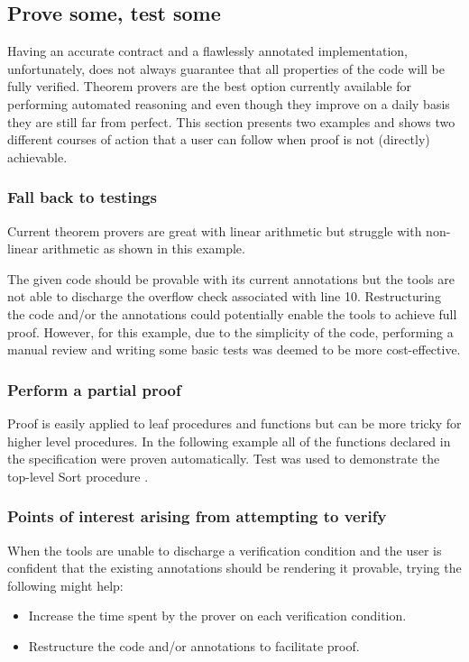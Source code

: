 \documentclass{llncs}
\begin{document}
\subsection{Prove some, test some}
Having an accurate contract and a flawlessly annotated implementation, unfortunately,
does not always guarantee that all properties of the code will be fully verified.
Theorem provers are the best option currently available for performing automated
reasoning and even though they improve on a daily basis they are still far from perfect.
This section presents two examples and shows two different courses of action
that a user can follow when proof is not (directly) achievable.

\subsubsection{Fall back to testings}
Current theorem provers are great with linear arithmetic but struggle with non-linear arithmetic as shown in this example.


The given code should be provable with its current annotations but the tools are not
able to discharge the overflow check associated with line 10. Restructuring the code
and/or the annotations could potentially enable the tools to achieve full proof. However,
for this example, due to the simplicity of the code, performing a manual review and writing
some basic tests was deemed to be more cost-effective.

\subsubsection{Perform a partial proof}
Proof is easily applied to leaf procedures and functions but can be more tricky for higher level procedures. In the following example all of the functions declared in the specification were proven automatically. Test was used to demonstrate the top-level Sort procedure .




\subsubsection{Points of interest arising from attempting to verify}
When the tools are unable to discharge a verification condition and the
user is confident that the existing annotations should be rendering it provable,
trying the following might help:
\begin{itemize}
  \item Increase the time spent by the prover on each verification condition.

  \item Restructure the code and/or annotations to facilitate proof.
\end{itemize}
\end{document}
